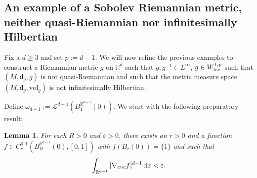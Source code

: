 \documentclass[a4paper,10pt]{article}
\newtheorem{lemma}[theorem]{Lemma}
\numberwithin{equation}{section}
\newcommand{\R}{\mathbb{R}}
\newcommand{\e}{\varepsilon}
\newcommand{\vol}{\mathrm{vol}}
\newcommand{\sfd}{\mathsf d}
\newcommand{\di}{{\rm d}}
\begin{document}
\subsection{An example of a Sobolev Riemannian metric, neither quasi-Riemannian nor infinitesimally Hilbertian}\label{subsec:sobolev}
 Fix a $d \geq 3$ and set $p := d-1$. We will now refine the previous examples to construct a Riemannian metric $g$ on $\R^d$ such that $g, g^{-1} \in L^{\infty}$, $g \in W^{1,p}_{\rm loc}$ such that $(M, \sfd_g, g)$ is not quasi-Riemannian and such that the metric measure space $(M, \sfd_g, 
 \vol_g)$ is not infinitesimally Hilbertian.  

 Define $\omega_{d-1}:= \mathcal{L}^{d-1}(B^{\R^{d-1}}_1(0))$. We start with the following preparatory result:
 \smallskip
 
 \begin{lemma}\label{good_sobolev_function}
     For each $R>0$ and $\e>0$, there exists an $r >0$ and a function $f \in C^{0,1}_c(B^{\R^{d-1}}_R(0), [0,1])$ with $f(B_r(0)) = \{1\}$ and such that
     \begin{align}
         \int_{\R^{d-1}} |\nabla_{euc}f|^{d-1}\, \di x < \e.
     \end{align}
 \end{lemma}
\end{document}
